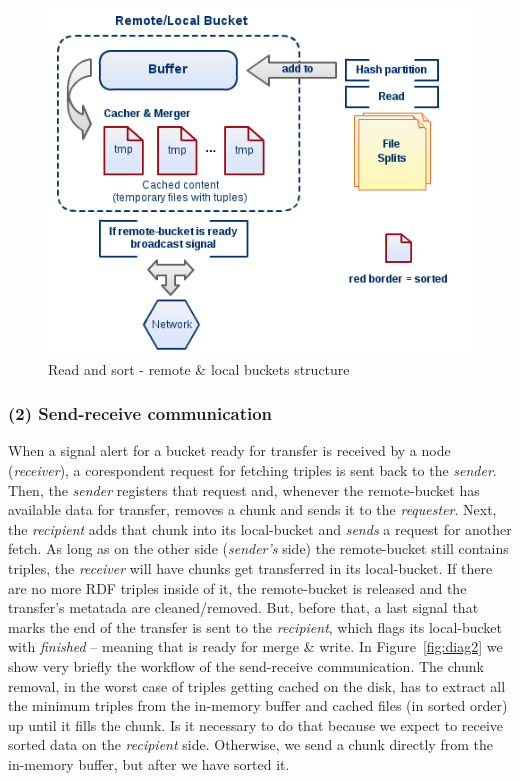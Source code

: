 \begin{figure}
\centering
\includegraphics[scale=0.6]{diag1}
\caption{Read and sort - remote \& local buckets structure}
\label{fig:diag1}
\end{figure}

% 
\subsubsection*{(2) Send-receive communication}

When a signal alert for a bucket ready for transfer is received by a node (\textit{receiver}), a corespondent request for fetching triples is sent back to the \textit{sender}. Then, the \textit{sender} registers that request and, whenever the remote-bucket has available data for transfer, removes a chunk and sends it to the \textit{requester}. Next, the \textit{recipient} adds that chunk into its local-bucket and \textit{sends} a request for another fetch. As long as on the other side (\textit{sender's} side) the remote-bucket still contains triples, the \textit{receiver} will have chunks get transferred in its local-bucket. If there are no more RDF triples inside of it, the remote-bucket is released and the transfer's metatada are cleaned/removed. But, before that, a last signal that marks the end of the transfer is sent to the \textit{recipient}, which flags its local-bucket with \textit{finished} -- meaning that is ready for merge \& write. In Figure~\ref{fig:diag2} we show very briefly the workflow of the send-receive communication. The chunk removal, in the worst case of triples getting cached on the disk, has to extract all the minimum triples from the in-memory buffer and cached files (in sorted order) up until it fills the chunk. Is it necessary to do that because we expect to receive sorted data on the \textit{recipient} side. Otherwise,  we send a chunk directly from the in-memory buffer, but after we have sorted it.

